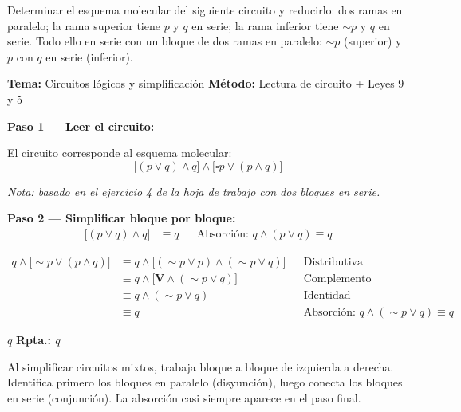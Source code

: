 \vspace{0.5cm}

\begin{tcolorbox}[
  enhanced, breakable,
  colback=GrisClaro, colframe=AzulPizarra,
  fonttitle=\bfseries\sffamily,
  title={Ejercicio 6 --- Circuito L\'{o}gico a Esquema Molecular (PUCP)},
  arc=3pt, boxrule=0.8pt
]
\begin{problema}
  Determinar el esquema molecular del siguiente circuito y reducirlo:
  dos ramas en paralelo; la rama superior tiene $p$ y $q$ en serie;
  la rama inferior tiene $\sim p$ y $q$ en serie. Todo ello en serie
  con un bloque de dos ramas en paralelo: $\sim p$ (superior) y $p$
  con $q$ en serie (inferior).
\end{problema}

\smallskip
\noindent
\textbf{\sffamily\color{AzulMedio}Tema:} Circuitos lógicos y simplificación
\hfill
\textbf{\sffamily\color{AzulMedio}M\'{e}todo:} Lectura de circuito + Leyes 9 y 5

\medskip
\noindent\textbf{\sffamily Paso 1 — Leer el circuito:}

\noindent El circuito corresponde al esquema molecular:
\[
  \bigl[(p \vee q) \wedge q\bigr] \wedge \bigl[\square p \vee (p \wedge q)\bigr]
\]

\noindent\textit{Nota: basado en el ejercicio 4 de la hoja de trabajo con
dos bloques en serie.}

\medskip
\noindent\textbf{\sffamily Paso 2 — Simplificar bloque por bloque:}
\begin{align*}
  \bigl[(p \vee q) \wedge q\bigr]
  &\equiv q
  && \text{Absorci\'{o}n: } q \wedge (p \vee q) \equiv q
\end{align*}

\begin{align*}
  q \wedge \bigl[\sim p \vee (p \wedge q)\bigr]
  &\equiv q \wedge \bigl[(\sim p \vee p) \wedge (\sim p \vee q)\bigr]
  && \text{Distributiva} \\[4pt]
  &\equiv q \wedge \bigl[\mathbf{V} \wedge (\sim p \vee q)\bigr]
  && \text{Complemento} \\[4pt]
  &\equiv q \wedge (\sim p \vee q)
  && \text{Identidad} \\[4pt]
  &\equiv q
  && \text{Absorci\'{o}n: } q \wedge (\sim p \vee q) \equiv q
\end{align*}

\medskip
\begin{tcolorbox}[
  colback=AzulClaro!60, colframe=AzulPizarra,
  arc=2pt, boxrule=0.8pt, left=8pt, right=8pt
]
\centering
$\displaystyle \boxed{q}$
\quad \textbf{Rpta.: $q$}
\end{tcolorbox}

\begin{cajatip}
  Al simplificar circuitos mixtos, trabaja bloque a bloque de izquierda
  a derecha. Identifica primero los bloques en paralelo (disyunción),
  luego conecta los bloques en serie (conjunción). La absorción casi
  siempre aparece en el paso final.
\end{cajatip}
\end{tcolorbox}


